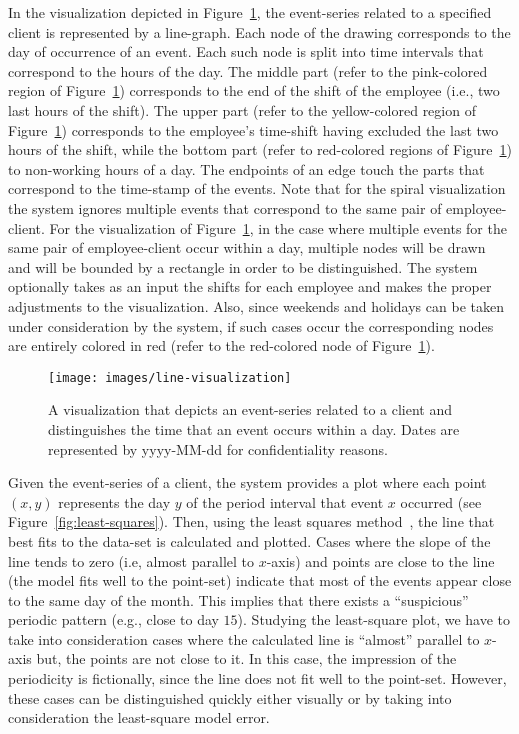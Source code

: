 \documentclass[conference]{IEEEtran}
\begin{document}
In the visualization depicted in
Figure~\ref{fig:line-visualization}, the event-series related to a
specified client is represented by a line-graph. Each node of the
drawing corresponds to the day of occurrence of an event. Each such
node is split into time intervals that correspond to the hours of
the day. The middle part (refer to the pink-colored region of
Figure~\ref{fig:line-visualization}) corresponds to the end of the
shift of the employee (i.e., two last hours of the shift). The upper
part (refer to the yellow-colored region of
Figure~\ref{fig:line-visualization}) corresponds to the employee's
time-shift having excluded the last two hours of the shift, while
the bottom part (refer to red-colored regions of
Figure~\ref{fig:line-visualization}) to non-working hours of a day.
The endpoints of an edge touch the parts that correspond to the
time-stamp of the events. Note that for the spiral visualization the
system ignores multiple events that correspond to the same pair of
employee-client. For the visualization of
Figure~\ref{fig:line-visualization}, in the case where multiple
events for the same pair of employee-client occur within a day,
multiple nodes will be drawn and will be bounded by a rectangle in
order to be distinguished. The system optionally takes as an input
the shifts for each employee and makes the proper adjustments to the
visualization. Also, since weekends and holidays can be taken under
consideration by the system, if such cases occur the corresponding
nodes are entirely colored in red (refer to the red-colored node of
Figure~\ref{fig:line-visualization}).

\begin{figure}[h!tb]
  \texttt{[image: images/line-visualization]}
  \caption{A visualization that depicts an event-series related to a client and distinguishes the time that an event occurs within a day. Dates are represented by yyyy-MM-dd for confidentiality reasons.}
  \label{fig:line-visualization}
\end{figure}

Given the event-series of a client, the system provides a plot where
each point $(x,y)$ represents the day $y$ of the period interval
that event $x$ occurred (see Figure~\ref{fig:least-squares}). Then,
using the least squares method~\cite{DS81}, the line that best fits
to the data-set is calculated and plotted. Cases where the slope of
the line tends to zero (i.e, almost parallel to $x$-axis) and points
are close to the line (the model fits well to the point-set)
indicate that most of the events appear close to the same day of the
month. This implies that there exists a ``suspicious'' periodic
pattern (e.g., close to day $15$). Studying the least-square plot,
we have to take into consideration cases where the calculated line
is ``almost'' parallel to $x$-axis but, the points are not close to
it. In this case, the impression of the periodicity is fictionally,
since the line does not fit well to the point-set. However, these
cases can be distinguished quickly either visually or by taking into
consideration the least-square model error.
\end{document}
